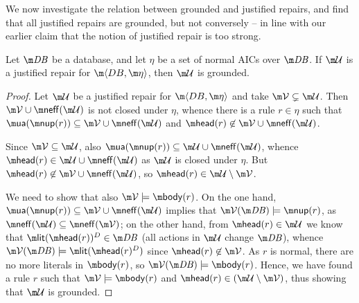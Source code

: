 We now investigate the relation between grounded and justified repairs, and find that all justified repairs are grounded, but not conversely -- in line with our earlier claim that the notion of justified repair is too strong.

\begin{proposition}
  \label{prop:justified}
  Let $\db$ be a database, and let $\eta$ be a set of normal AICs over $\db$. If $\UU$ is a justified repair for $\fulldb$, then $\UU$ is grounded.
\end{proposition}
\begin{proof}
  Let $\UU$ be a justified repair for $\fulldb$ and take $\VV\subsetneq\UU$.
  Then $\VV\cup\neff(\UU)$ is not closed under $\eta$, whence there is a rule $r\in\eta$ such that $\actof(\nup(r))\subseteq\VV\cup\neff(\UU)$ and $\head(r)\not\in\VV\cup\neff(\UU)$.

  Since $\VV\subseteq\UU$, also $\actof(\nup(r))\subseteq\UU\cup\neff(\UU)$, whence $\head(r)\in\UU\cup\neff(\UU)$ as $\UU$ is closed under $\eta$.
  But $\head(r)\not\in\VV\cup\neff(\UU)$, so $\head(r)\in\UU\setminus\VV$.

  We need to show that also $\VV\models\body(r)$. On the one hand, $\actof(\nup(r))\subseteq\VV\cup\neff(\UU)$ implies that $\VV(\db)\models\nup(r)$, as $\neff(\UU)\subseteq\neff(\VV)$; on the other hand, from $\head(r)\in\UU$ we know that $\litof(\head(r))^D\in\db$ (all actions in $\UU$ change $\db$), whence $\VV(\db)\models\litof(\head(r)^D)$ since $\head(r)\not\in\VV$.
  As $r$ is normal, there are no more literals in $\body(r)$, so $\VV(\db)\models\body(r)$. 
  Hence, we have found a rule $r$ such that $\VV\models \body(r)$ and $\head(r)\in(\UU\setminus\VV)$, thus showing that $\UU$ is grounded.
\end{proof}


